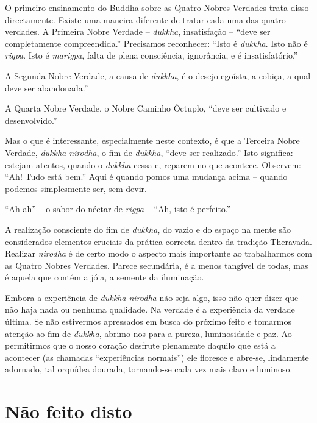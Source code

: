 O primeiro ensinamento do Buddha sobre as Quatro Nobres Verdades trata
disso directamente. Existe uma maneira diferente de tratar cada uma das
quatro verdades. A Primeira Nobre Verdade -- \emph{dukkha}, insatisfação
-- ``deve ser completamente compreendida.'' Precisamos reconhecer:
``Isto é \emph{dukkha}. Isto não é \emph{rigpa}. Isto é \emph{marigpa},
falta de plena consciência, ignorância, e é insatisfatório.''

A Segunda Nobre Verdade, a causa de \emph{dukkha}, é o desejo egoísta, a
cobiça, a qual deve ser abandonada.''

A Quarta Nobre Verdade, o Nobre Caminho Óctuplo, ``deve ser cultivado e
desenvolvido.''

Mas o que é interessante, especialmente neste contexto, é que a Terceira
Nobre Verdade, \emph{dukkha-nirodha}, o fim de \emph{dukkha}, ``deve
ser realizado.'' Isto significa: estejam atentos, quando o
\emph{dukkha} cessa e, reparem no que acontece. Observem: ``Ah! Tudo
está bem.'' Aqui é quando pomos uma mudança acima -- quando podemos
simplesmente ser, sem devir.

``Ah ah'' -- o sabor do néctar de \emph{rigpa} -- ``Ah, isto é
perfeito.''

A realização consciente do fim de \emph{dukkha}, do vazio e do espaço na
mente são considerados elementos cruciais da prática correcta dentro da
tradição Theravada. Realizar \emph{nirodha} é de certo modo o aspecto
mais importante ao trabalharmos com as Quatro Nobres Verdades. Parece
secundária, é a menos tangível de todas, mas é aquela que contém a jóia,
a semente da iluminação.

Embora a experiência de \emph{dukkha-nirodha} não seja algo, isso não
quer dizer que não haja nada ou nenhuma qualidade. Na verdade é a
experiência da verdade última. Se não estivermos apressados em busca do
próximo feito e tomarmos atenção ao fim de \emph{dukkha}, abrimo-nos
para a pureza, luminosidade e paz. Ao permitirmos que o nosso coração
desfrute plenamente daquilo que está a acontecer (as chamadas
``experiências normais'') ele floresce e abre-se, lindamente adornado,
tal orquídea dourada, tornando-se cada vez mais claro e luminoso.

\section{Não feito disto}

